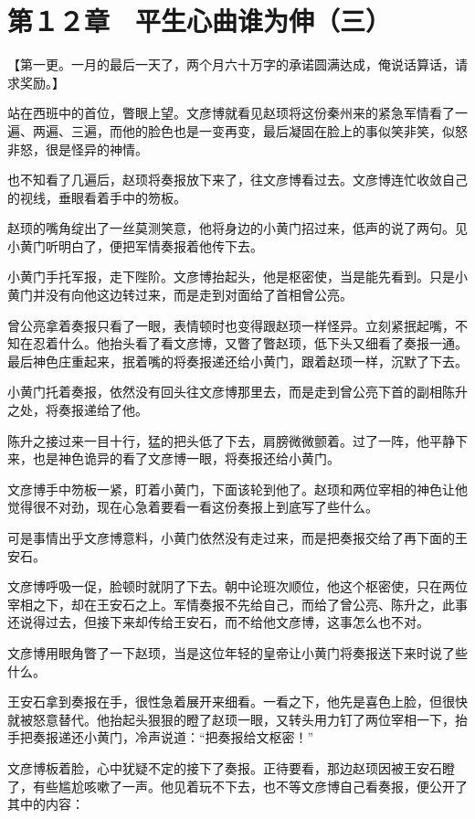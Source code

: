 \section{第１２章　平生心曲谁为伸（三）}

【第一更。一月的最后一天了，两个月六十万字的承诺圆满达成，俺说话算话，请求奖励。】

站在西班中的首位，瞥眼上望。文彦博就看见赵顼将这份秦州来的紧急军情看了一遍、两遍、三遍，而他的脸色也是一变再变，最后凝固在脸上的事似笑非笑，似怒非怒，很是怪异的神情。

也不知看了几遍后，赵顼将奏报放下来了，往文彦博看过去。文彦博连忙收敛自己的视线，垂眼看着手中的笏板。

赵顼的嘴角绽出了一丝莫测笑意，他将身边的小黄门招过来，低声的说了两句。见小黄门听明白了，便把军情奏报着他传下去。

小黄门手托军报，走下陛阶。文彦博抬起头，他是枢密使，当是能先看到。只是小黄门并没有向他这边转过来，而是走到对面给了首相曾公亮。

曾公亮拿着奏报只看了一眼，表情顿时也变得跟赵顼一样怪异。立刻紧抿起嘴，不知在忍着什么。他抬头看了看文彦博，又瞥了瞥赵顼，低下头又细看了奏报一通。最后神色庄重起来，抿着嘴的将奏报递还给小黄门，跟着赵顼一样，沉默了下去。

小黄门托着奏报，依然没有回头往文彦博那里去，而是走到曾公亮下首的副相陈升之处，将奏报递给了他。

陈升之接过来一目十行，猛的把头低了下去，肩膀微微颤着。过了一阵，他平静下来，也是神色诡异的看了文彦博一眼，将奏报还给小黄门。

文彦博手中笏板一紧，盯着小黄门，下面该轮到他了。赵顼和两位宰相的神色让他觉得很不对劲，现在心急着要看一看这份奏报上到底写了些什么。

可是事情出乎文彦博意料，小黄门依然没有走过来，而是把奏报交给了再下面的王安石。

文彦博呼吸一促，脸顿时就阴了下去。朝中论班次顺位，他这个枢密使，只在两位宰相之下，却在王安石之上。军情奏报不先给自己，而给了曾公亮、陈升之，此事还说得过去，但接下来却传给王安石，而不给他文彦博，这事怎么也不对。

文彦博用眼角瞥了一下赵顼，当是这位年轻的皇帝让小黄门将奏报送下来时说了些什么。

王安石拿到奏报在手，很性急着展开来细看。一看之下，他先是喜色上脸，但很快就被怒意替代。他抬起头狠狠的瞪了赵顼一眼，又转头用力钉了两位宰相一下，抬手把奏报递还小黄门，冷声说道：“把奏报给文枢密！”

文彦博板着脸，心中犹疑不定的接下了奏报。正待要看，那边赵顼因被王安石瞪了，有些尴尬咳嗽了一声。他见着玩不下去，也不等文彦博自己看奏报，便公开了其中的内容：

